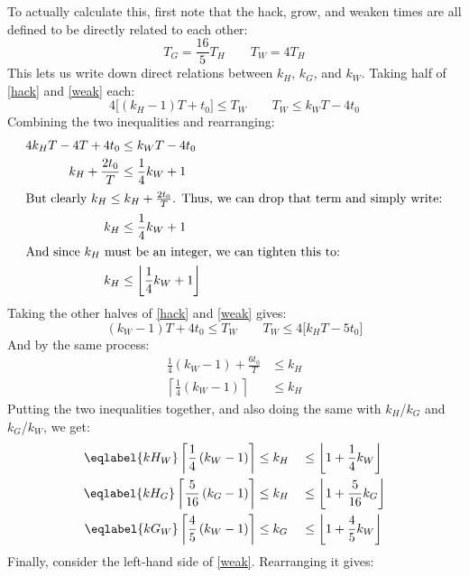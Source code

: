 \documentclass[veryplain]{notes}
\begin{document}
To actually calculate this, first note that the hack, grow, and weaken times are all defined to be directly related to each other:
\begin{equation}
    T_G = \frac{16}{5} T_H \qquad T_W = 4 T_H
\end{equation}
This lets us write down direct relations between $k_H$, $k_G$, and $k_W$. Taking half of \eqref{hack} and \eqref{weak} each:
\begin{equation}
    4 \big[ (k_H - 1)T + t_0 \big] \le T_W \qquad T_W \le k_W T - 4 t_0
\end{equation}
Combining the two inequalities and rearranging:
\begin{align}
    4k_H T - 4T + 4 t_0 &\le k_W T - 4 t_0 \\
    k_H + \frac{2t_0}{T} &\le \frac14 k_W + 1 \\
    \intertext{But clearly $k_H \le k_H + \frac{2t_0}{T}$. Thus, we can drop that term and simply write:}
    k_H &\le \frac14 k_W + 1 \\
    \intertext{And since $k_H$ must be an integer, we can tighten this to:}
    k_H &\le \left\lfloor \frac14 k_W + 1 \right\rfloor
\end{align}
Taking the other halves of \eqref{hack} and \eqref{weak} gives:
\begin{equation}
    (k_W - 1)T + 4t_0 \le T_W \qquad T_W \le 4 \big[ k_H T - 5 t_0 \big]
\end{equation}
And by the same process:
\begin{align}
    \frac14 \left( k_W - 1 \right) + \frac{6t_0}{T} &\le k_H \\
    \left\lceil \frac14 \left( k_W - 1 \right) \right\rceil &\le k_H
\end{align}
Putting the two inequalities together, and also doing the same with $k_H$/$k_G$ and $k_G$/$k_W$, we get:
\begin{alignat}{3}
    \eqlabel{kH_W}
    \left\lceil \frac{1}{4}  \left( k_W - 1 \right) \right\rceil &\le k_H &&\le \left\lfloor 1 + \frac{1}{4}  k_W \right\rfloor \\
    \eqlabel{kH_G}
    \left\lceil \frac{5}{16} \left( k_G - 1 \right) \right\rceil &\le k_H &&\le \left\lfloor 1 + \frac{5}{16} k_G \right\rfloor \\
    \eqlabel{kG_W}
    \left\lceil \frac{4}{5}  \left( k_W - 1 \right) \right\rceil &\le k_G &&\le \left\lfloor 1 + \frac{4}{5}  k_W \right\rfloor
\end{alignat}
Finally, consider the left-hand side of \eqref{weak}. Rearranging it gives:
\end{document}
